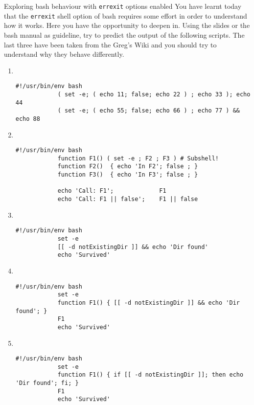 
\begin{exercise}[Instructive]{Exploring bash behaviour with \texttt{errexit} options enabled}
    You have learnt today that the \texttt{errexit} shell option of bash requires some effort in order to understand how it works.
    Here you have the opportunity to deepen in.
    Using the slides or the bash manual as guideline, try to predict the output of the following scripts.
    The last three have been taken from the Greg's Wiki and you should try to understand why they behave differently.
    \begin{enumerate}
        \item ~
        \begin{lstlisting}[style=myBash, numbers=none, aboveskip=0mm]
            #!/usr/bin/env bash
            ( set -e; ( echo 11; false; echo 22 ) ; echo 33 ); echo 44
            ( set -e; ( echo 55; false; echo 66 ) ; echo 77 ) && echo 88
        \end{lstlisting}
        \item ~
        \begin{lstlisting}[style=myBash, numbers=none, aboveskip=0mm]
            #!/usr/bin/env bash
            function F1() ( set -e ; F2 ; F3 ) # Subshell!
            function F2()  { echo 'In F2'; false ; }
            function F3()  { echo 'In F3'; false ; }

            echo 'Call: F1';             F1
            echo 'Call: F1 || false';    F1 || false
        \end{lstlisting}
        \item ~
        \begin{lstlisting}[style=myBash, numbers=none, aboveskip=0mm]
            #!/usr/bin/env bash
            set -e
            [[ -d notExistingDir ]] && echo 'Dir found'
            echo 'Survived'
        \end{lstlisting}
        \item ~
        \begin{lstlisting}[style=myBash, numbers=none, aboveskip=0mm]
            #!/usr/bin/env bash
            set -e
            function F1() { [[ -d notExistingDir ]] && echo 'Dir found'; }
            F1
            echo 'Survived'
        \end{lstlisting}
        \item ~
        \begin{lstlisting}[style=myBash, numbers=none, aboveskip=0mm]
            #!/usr/bin/env bash
            set -e
            function F1() { if [[ -d notExistingDir ]]; then echo 'Dir found'; fi; }
            F1
            echo 'Survived'
        \end{lstlisting}
    \end{enumerate}
\end{exercise}